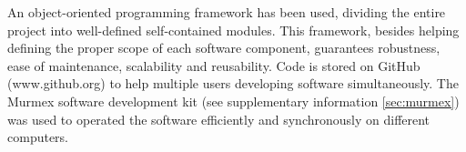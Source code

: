 \documentclass[12pt]{spieman}  %
\begin{document}

An object-oriented programming framework \cite{castagna1997object} has been used, dividing the entire project into well-defined self-contained modules. This framework, besides helping defining the proper scope of each software component, guarantees robustness, ease of maintenance, scalability and reusability. Code is stored on GitHub (www.github.org) to help multiple users developing software simultaneously. %
The Murmex software development kit (see supplementary information \ref{sec:murmex}) was used to operated the software efficiently and synchronously on different computers.
\end{document}
